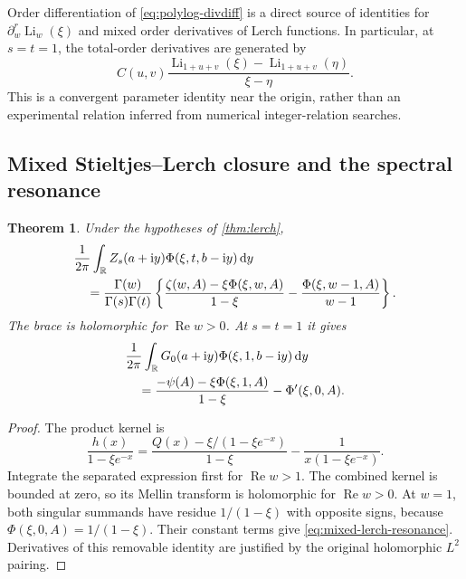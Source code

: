 \documentclass[11pt,a4paper]{article}
\newtheorem{theorem}{Theorem}[section]
\theoremstyle{definition}
\numberwithin{equation}{section}
\newcommand{\R}{\mathbb R}
\newcommand{\Rea}{\operatorname{Re}}
\newcommand{\Li}{\operatorname{Li}}
\newcommand{\dd}{\,\mathrm d}
\newcommand{\ii}{\mathrm i}
\begin{document}
Order differentiation of \eqref{eq:polylog-divdiff} is a direct source of
identities for $\partial_w^r\Li_w(\xi)$ and mixed order derivatives of
Lerch functions. In particular, at $s=t=1$, the total-order derivatives
are generated by
\[
 C(u,v)\frac{\Li_{1+u+v}(\xi)-\Li_{1+u+v}(\eta)}{\xi-\eta}.
\]
This is a convergent parameter identity near the origin, rather than an
experimental relation inferred from numerical integer-relation searches.

\subsection{Mixed Stieltjes--Lerch closure and the spectral resonance}
\begin{theorem}\label{thm:mixed-lerch}
Under the hypotheses of \cref{thm:lerch},
\begin{align}
 &\frac1{2\pi}\int_{\R}Z_s(a+\ii y)\Phi(\xi,t,b-\ii y)\dd y\notag\\
 &\quad=\frac{\Gamma(w)}{\Gamma(s)\Gamma(t)}
  \left\{\frac{\zeta(w,A)-\xi\Phi(\xi,w,A)}{1-\xi}
                     -\frac{\Phi(\xi,w-1,A)}{w-1}\right\}.
                         \label{eq:mixed-lerch}
\end{align}
The brace is holomorphic for $\Rea w>0$. At $s=t=1$ it gives
\begin{align}
 &\frac1{2\pi}\int_{\R}G_0(a+\ii y)\Phi(\xi,1,b-\ii y)\dd y\notag\\
 &\quad=\frac{-\psi(A)-\xi\Phi(\xi,1,A)}{1-\xi}
                                  -\Phi'(\xi,0,A).
                                      \label{eq:mixed-lerch-resonance}
\end{align}
\end{theorem}
\begin{proof}
The product kernel is
\[
 \frac{h(x)}{1-\xi e^{-x}}
 =\frac{Q(x)-\xi/(1-\xi e^{-x})}{1-\xi}
                     -\frac1{x(1-\xi e^{-x})}.
\]
Integrate the separated expression first for $\Rea w>1$.
The combined kernel is bounded at zero, so its Mellin transform is
holomorphic for $\Rea w>0$. At $w=1$, both singular summands have residue
$1/(1-\xi)$ with opposite signs, because
$\Phi(\xi,0,A)=1/(1-\xi)$. Their constant terms give
\eqref{eq:mixed-lerch-resonance}. Derivatives of this removable identity
are justified by the original holomorphic $L^2$ pairing.
\end{proof}
\end{document}
